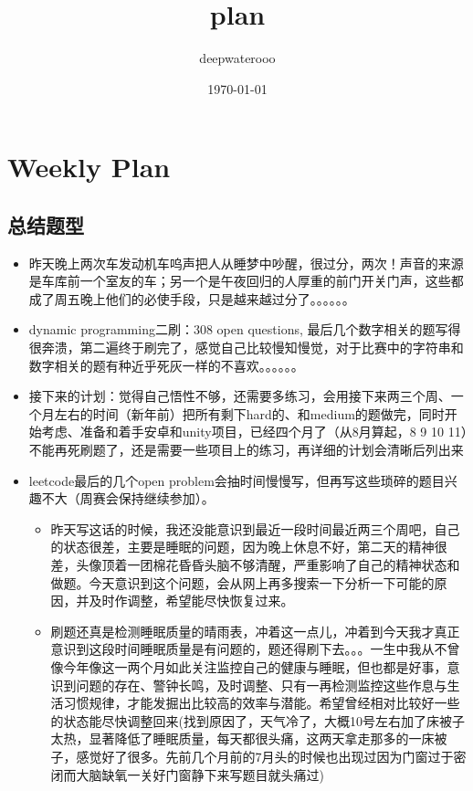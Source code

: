 \documentclass[9pt, b5paaper]{book}
\author{deepwaterooo}
\date{\today}
\title{plan}
\begin{document}
\maketitle
\tableofcontents


\chapter{Weekly Plan}
\label{sec-1}
\section{总结题型}
\label{sec-1-1}
\begin{itemize}
\item 昨天晚上两次车发动机车呜声把人从睡梦中吵醒，很过分，两次！声音的来源
是车库前一个室友的车；另一个是午夜回归的人厚重的前门开关门声，这些都
成了周五晚上他们的必使手段，只是越来越过分了。。。。。。
\item dynamic programming二刷：308 open questions, 最后几个数字相关的题写得很奔溃，第二遍终于刷完了，感觉自己比较慢知慢觉，对于比赛中的字符串和数字相关的题有种近乎死灰一样的不喜欢。。。。。。
\item 接下来的计划：觉得自己悟性不够，还需要多练习，会用接下来两三个周、一个月左右的时间（新年前）把所有剩下hard的、和medium的题做完，同时开始考虑、准备和着手安卓和unity项目，已经四个月了（从8月算起，8 9 10 11）不能再死刷题了，还是需要一些项目上的练习，再详细的计划会清晰后列出来
\item leetcode最后的几个open problem会抽时间慢慢写，但再写这些琐碎的题目兴趣不大（周赛会保持继续参加）。
\begin{itemize}
\item 昨天写这话的时候，我还没能意识到最近一段时间最近两三个周吧，自己的状态很差，主要是睡眠的问题，因为晚上休息不好，第二天的精神很差，头像顶着一团棉花昏昏头脑不够清醒，严重影响了自己的精神状态和做题。今天意识到这个问题，会从网上再多搜索一下分析一下可能的原因，并及时作调整，希望能尽快恢复过来。
\item 刷题还真是检测睡眠质量的晴雨表，冲着这一点儿，冲着到今天我才真正意识到这段时间睡眠质量是有问题的，题还得刷下去。。。一生中我从不曾像今年像这一两个月如此关注监控自己的健康与睡眠，但也都是好事，意识到问题的存在、警钟长鸣，及时调整、只有一再检测监控这些作息与生活习惯规律，才能发掘出比较高的效率与潜能。希望曾经相对比较好一些的状态能尽快调整回来(找到原因了，天气冷了，大概10号左右加了床被子太热，显著降低了睡眠质量，每天都很头痛，这两天拿走那多的一床被子，感觉好了很多。先前几个月前的7月头的时候也出现过因为门窗过于密闭而大脑缺氧一关好门窗静下来写题目就头痛过)
\end{itemize}


\end{itemize}
\end{document}

